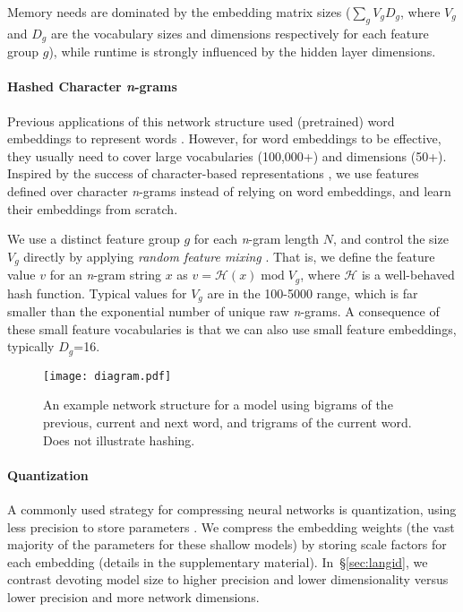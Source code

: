 \documentclass[11pt,letterpaper]{article}
\newcommand{\kgram}[1]{{\it #1}-gram}
\newcommand{\kgrams}[1]{{\it #1}-grams}
\newcommand{\ngram}{\kgram{n}}
\newcommand{\ngrams}{\kgrams{n}}
\begin{document}
Memory needs
are dominated by the embedding matrix sizes ($\sum_g V_g D_g$, where $V_g$ and $D_g$ are the vocabulary sizes and dimensions respectively for each feature group $g$),
while runtime is strongly influenced by the
hidden layer dimensions.

\paragraph{Hashed Character \ngrams}
\label{sec:characterngrams}
Previous applications of this network structure used (pretrained) word embeddings to represent words \cite{chen-manning:2014:EMNLP,weiss-etAl:2015:ACL}.
However, for word embeddings to be effective, they usually need to cover large vocabularies (100,000+) and dimensions (50+).
Inspired by the success of character-based representations \cite{ling2015:charscomposed}, we use features defined over character \ngrams{} instead of relying on word embeddings, and learn their embeddings from scratch.

We use a distinct feature group $g$ for each \ngram{} length $N$, and control the size $V_g$ directly by applying \emph{random feature mixing} \cite{ganchev2008small}.
That is, we define the feature value $v$ for an \ngram{} string $x$ as 
$ v=\mathcal{H}(x) \; \mathrm{mod} \; V_g $,
where $\mathcal{H}$ is a well-behaved hash function.
Typical values for $V_g$ are in the 100-5000 range, which is far smaller than the exponential number of unique raw \ngrams{}.
A consequence of these small feature vocabularies is that we can also use small feature embeddings, typically $D_g$=16.


\begin{figure}[t]
  \centering
  \texttt{[image: diagram.pdf]}
 \caption{An example network structure for a model using bigrams of the previous, current and next word, and trigrams of the current word. Does not illustrate hashing.
  }
  \label{fig:model}
\end{figure}

\paragraph{Quantization}
\label{sec:quantization}
A commonly used strategy for compressing neural networks is quantization, using
less precision to store parameters \cite{han2015deep}.
We compress the embedding weights (the vast majority of the parameters for these shallow models) by storing scale factors for each embedding (details in the supplementary material).
In~\S\ref{sec:langid}, we contrast devoting model size to higher precision and lower dimensionality
versus lower precision and more network dimensions.
\end{document}
